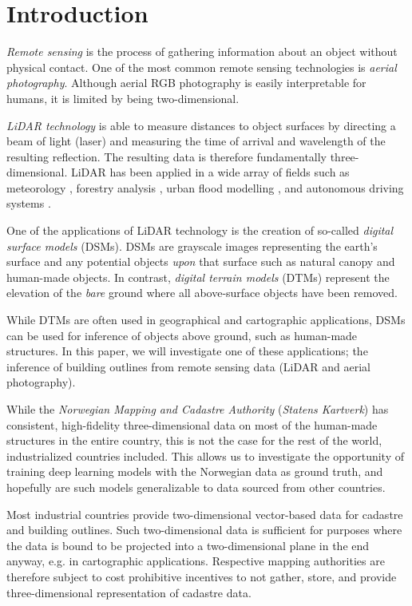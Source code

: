 \section*{Introduction}

\textit{Remote sensing} is the process of gathering information about an object without physical contact.
One of the most common remote sensing technologies is \textit{aerial photography}.
Although aerial RGB photography is easily interpretable for humans, it is limited by being two-dimensional.

\textit{LiDAR technology} is able to measure distances to object surfaces by directing a beam of light (laser) and measuring the time of arrival and wavelength of the resulting reflection.
The resulting data is therefore fundamentally three-dimensional.
LiDAR has been applied in a wide array of fields such as meteorology \cite{lidar_meteorology_1966}, forestry analysis \cite{lidar_forestry_2000}, urban flood modelling \cite{lidar_flood_2013}, and autonomous driving systems \cite{lidar_self_driving_2018}.

One of the applications of LiDAR technology is the creation of so-called \textit{digital surface models} (DSMs).
DSMs are grayscale images representing the earth's surface and any potential objects \textit{upon} that surface such as natural canopy and human-made objects.
In contrast, \textit{digital terrain models} (DTMs) represent the elevation of the \textit{bare} ground where all above-surface objects have been removed.

While DTMs are often used in geographical and cartographic applications, DSMs can be used for inference of objects above ground, such as human-made structures.
In this paper, we will investigate one of these applications; the inference of building outlines from remote sensing data (LiDAR and aerial photography).

While the \textit{Norwegian Mapping and Cadastre Authority} (\textit{Statens Kartverk}) has consistent, high-fidelity three-dimensional data on most of the human-made structures in the entire country, this is not the case for the rest of the world, industrialized countries included.
This allows us to investigate the opportunity of training deep learning models with the Norwegian data as ground truth, and hopefully are such models generalizable to data sourced from other countries.

Most industrial countries provide two-dimensional vector-based data for cadastre and building outlines.
Such two-dimensional data is sufficient for purposes where the data is bound to be projected into a two-dimensional plane in the end anyway, e.g. in cartographic applications.
Respective mapping authorities are therefore subject to cost prohibitive incentives to not gather, store, and provide three-dimensional representation of cadastre data.

